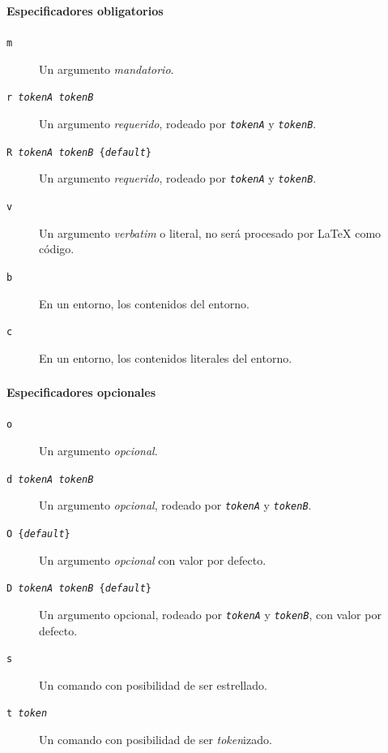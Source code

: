 \documentclass[12pt,aspectratio=169,ignorenonframetext]{ltxbeamer}
\begin{document}
\begin{frame}
\frametitle{{\lmr{}}}
\framesubtitle{Especificadores obligatorios}

\begin{description}
    \item[\texttt{m}] Un argumento \emph{mandatorio}.
    \item[\texttt{r \textit{tokenA} \textit{tokenB}}] Un argumento \emph{requerido}, rodeado por \texttt{\textit{tokenA}} y \texttt{\textit{tokenB}}.
    \item[\texttt{R \textit{tokenA} \textit{tokenB} \{\textit{default}\}}] Un argumento \emph{requerido}, rodeado por \texttt{\textit{tokenA}} y \texttt{\textit{tokenB}}.
    \item[\texttt{v}] Un argumento \emph{verbatim} o literal, no será procesado por {\lmr\LaTeX} como código.
    \item[\texttt{b}] En un entorno, los contenidos del entorno.
    \item[\texttt{c}] En un entorno, los contenidos literales del entorno.
\end{description}
\end{frame}





\begin{frame}
\frametitle{{\lmr{}}}
\framesubtitle{Especificadores opcionales}

\begin{description}
    \item[\texttt{o}] Un argumento \emph{opcional}.
    \item[\texttt{d \textit{tokenA} \textit{tokenB}}] Un argumento \emph{opcional}, rodeado por \texttt{\textit{tokenA}} y \texttt{\textit{tokenB}}.
    \item[\texttt{O \{\textit{default}\}}] Un argumento \emph{opcional} con valor por defecto.
    \item[\texttt{D \textit{tokenA} \textit{tokenB} \{\textit{default}\}}] Un argumento opcional, rodeado por \texttt{\textit{tokenA}} y \texttt{\textit{tokenB}}, con valor por defecto.
    \item[\texttt{s}] Un comando con posibilidad de ser estrellado.
    \item[\texttt{t \textit{token}}] Un comando con posibilidad de ser \emph{token}izado.
\end{description}
\end{frame}
\end{document}
